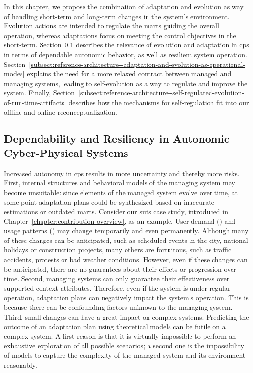 In this chapter, we propose the combination of adaptation and evolution as way of handling short-term and long-term changes in the system's environment. Evolution actions are intended to regulate the \glspl{mart} guiding the overall operation, whereas adaptations focus on meeting the control objectives in the short-term.  Section~\ref{subsect:reference-architecture--dependability-and-resiliency} describes the relevance of evolution and adaptation in \gls{cps} in terms of dependable autonomic behavior, as well as resilient system operation. Section~\ref{subsect:reference-architecture--adaptation-and-evolution-as-operational-modes} explains the need for a more relaxed contract between managed and managing systems, leading to self-evolution as a way to regulate and improve the system. Finally, Section~\ref{subsect:reference-architecture--self-regulated-evolution-of-run-time-artifacts} describes how the mechanisms for self-regulation fit into our offline and online reconceptualization.

\subsection{Dependability and Resiliency in Autonomic Cyber-Physical Systems}
\label{subsect:reference-architecture--dependability-and-resiliency}

Increased autonomy in \gls{cps} results in more uncertainty and thereby more risks. First, internal structures and behavioral models of the managing system may become unsuitable: since elements of the managed system evolve over time, at some point adaptation plans could be synthesized based on inaccurate estimations or outdated \glspl{mart}. Consider our \gls{suts} case study, introduced in Chapter~\ref{chapter:contribution-overview}, as an example. User demand () and usage patterns () may change temporarily and even permanently. Although many of these changes can be anticipated, such as scheduled events in the city, national holidays or construction projects, many others are fortuitous, such as traffic accidents, protests or bad weather conditions. However, even if these changes can be anticipated, there are no guarantees about their effects or progression over time. Second, managing systems can only guarantee their effectiveness over supported context attributes. Therefore, even if the system is under regular operation, adaptation plans can negatively impact the system's operation. This is because there can be confounding factors unknown to the managing system. Third, small changes can have a great impact on complex systems. Predicting the outcome of an adaptation plan using theoretical models can be futile on a complex system. A first reason is that it is virtually impossible to perform an exhaustive exploration of all possible scenarios; a second one is the impossibility of models to capture the complexity of the managed system and its environment reasonably.

